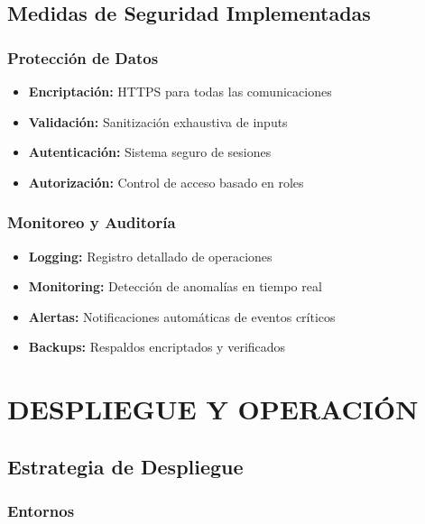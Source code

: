 \documentclass[12pt,a4paper]{article}
\begin{document}
\subsection{Medidas de Seguridad Implementadas}

\subsubsection{Protección de Datos}

\begin{itemize}
    \item \textbf{Encriptación:} HTTPS para todas las comunicaciones
    \item \textbf{Validación:} Sanitización exhaustiva de inputs
    \item \textbf{Autenticación:} Sistema seguro de sesiones
    \item \textbf{Autorización:} Control de acceso basado en roles
\end{itemize}

\subsubsection{Monitoreo y Auditoría}

\begin{itemize}
    \item \textbf{Logging:} Registro detallado de operaciones
    \item \textbf{Monitoring:} Detección de anomalías en tiempo real
    \item \textbf{Alertas:} Notificaciones automáticas de eventos críticos
    \item \textbf{Backups:} Respaldos encriptados y verificados
\end{itemize}

\section{DESPLIEGUE Y OPERACIÓN}

\subsection{Estrategia de Despliegue}

\subsubsection{Entornos}
\end{document}
